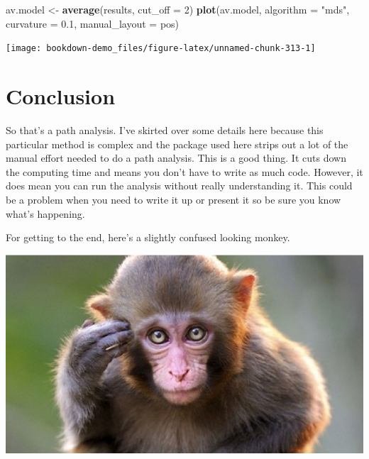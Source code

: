 \documentclass[
]{book}
\newenvironment{Shaded}{\begin{snugshade}}{\end{snugshade}}
\newcommand{\DataTypeTok}[1]{\textcolor[rgb]{0.13,0.29,0.53}{#1}}
\newcommand{\DecValTok}[1]{\textcolor[rgb]{0.00,0.00,0.81}{#1}}
\newcommand{\FloatTok}[1]{\textcolor[rgb]{0.00,0.00,0.81}{#1}}
\newcommand{\KeywordTok}[1]{\textcolor[rgb]{0.13,0.29,0.53}{\textbf{#1}}}
\newcommand{\NormalTok}[1]{#1}
\newcommand{\StringTok}[1]{\textcolor[rgb]{0.31,0.60,0.02}{#1}}
\begin{document}
\begin{Shaded}
\begin{Highlighting}[]
\NormalTok{av.model \textless{}{-}}\StringTok{ }\KeywordTok{average}\NormalTok{(results, }\DataTypeTok{cut\_off =} \DecValTok{2}\NormalTok{)}
\KeywordTok{plot}\NormalTok{(av.model, }\DataTypeTok{algorithm =} \StringTok{"mds"}\NormalTok{, }\DataTypeTok{curvature =} \FloatTok{0.1}\NormalTok{, }\DataTypeTok{manual\_layout =}\NormalTok{ pos)}
\end{Highlighting}
\end{Shaded}

\begin{center}\texttt{[image: bookdown-demo\_files/figure-latex/unnamed-chunk-313-1]} \end{center}

\hypertarget{conclusion-1}{%
\section{Conclusion}\label{conclusion-1}}

So that's a path analysis. I've skirted over some details here because this particular method is complex and the package used here strips out a lot of the manual effort needed to do a path analysis. This is a good thing. It cuts down the computing time and means you don't have to write as much code. However, it does mean you can run the analysis without really understanding it. This could be a problem when you need to write it up or present it so be sure you know what's happening.

For getting to the end, here's a slightly confused looking monkey.

\begin{center}\includegraphics[width=10.1in]{Images/monkey} \end{center}
\end{document}

